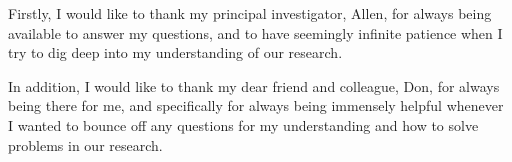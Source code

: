 \begin{acknowledgements}
		Firstly, I would like to thank my principal investigator, Allen, for always being available to answer my questions, and to have seemingly infinite patience when I try to dig deep into my understanding of our research. 

		In addition, I would like to thank my dear friend and colleague, Don, for always being there for me, and specifically for always being immensely helpful whenever I wanted to bounce off any questions for my understanding and how to solve problems in our research.
\end{acknowledgements}
